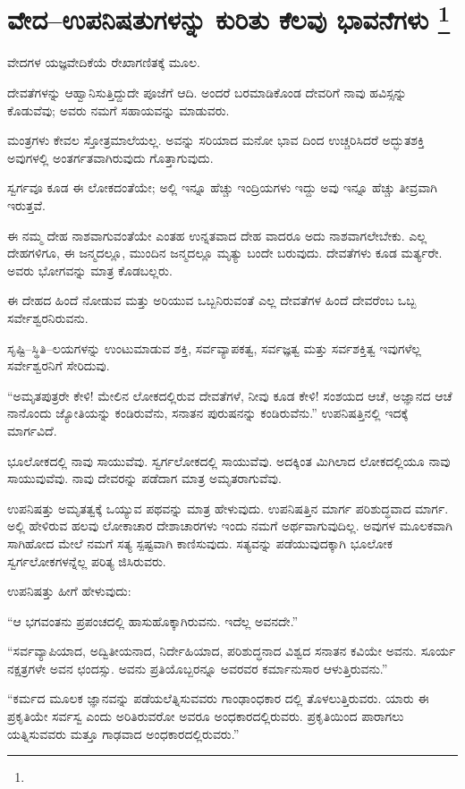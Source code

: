 
\chapter[ವೇದ–ಉಪನಿಷತುಗಳನ್ನು ಕುರಿತು ಕೆಲವು ಭಾವನೆಗಳು ]{ವೇದ–ಉಪನಿಷತುಗಳನ್ನು ಕುರಿತು ಕೆಲವು ಭಾವನೆಗಳು \protect\footnote{}}

ವೇದಗಳ ಯಜ್ಞವೇದಿಕೆಯೆ ರೇಖಾಗಣಿತಕ್ಕೆ  ಮೂಲ.

ದೇವತೆಗಳನ್ನು ಆಹ್ವಾನಿಸುತ್ತಿದ್ದುದೇ ಪೂಜೆಗೆ ಆದಿ. ಅಂದರೆ ಬರಮಾಡಿಕೊಂಡ ದೇವರಿಗೆ ನಾವು ಹವಿಸ್ಸನ್ನು ಕೊಡುವೆವು; ಅವರು ನಮಗೆ ಸಹಾಯವನ್ನು ಮಾಡುವರು.

ಮಂತ್ರಗಳು ಕೇವಲ ಸ್ತೋತ್ರಮಾಲೆಯಲ್ಲ. ಅವನ್ನು ಸರಿಯಾದ ಮನೋ ಭಾವ ದಿಂದ ಉಚ್ಚರಿಸಿದರೆ ಅದ್ಭುತಶಕ್ತಿ ಅವುಗಳಲ್ಲಿ ಅಂತರ್ಗತವಾಗಿರುವುದು ಗೊತ್ತಾಗುವುದು.

ಸ್ವರ್ಗವೂ ಕೂಡ ಈ ಲೋಕದಂತೆಯೇ; ಅಲ್ಲಿ ಇನ್ನೂ ಹೆಚ್ಚು ಇಂದ್ರಿಯಗಳು ಇದ್ದು ಅವು ಇನ್ನೂ ಹೆಚ್ಚು ತೀವ್ರವಾಗಿ ಇರುತ್ತವೆ.

ಈ ನಮ್ಮ ದೇಹ ನಾಶವಾಗುವಂತೆಯೇ ಎಂತಹ ಉನ್ನತವಾದ ದೇಹ ವಾದರೂ ಅದು ನಾಶವಾಗಲೇಬೇಕು. ಎಲ್ಲ ದೇಹಗಳಿಗೂ, ಈ ಜನ್ಮದಲ್ಲೂ, ಮುಂದಿನ ಜನ್ಮದಲ್ಲೂ ಮೃತ್ಯು ಬಂದೇ ಬರುವುದು. ದೇವತೆಗಳು ಕೂಡ ಮರ್ತ್ಯರೇ. ಅವರು ಭೋಗವನ್ನು ಮಾತ್ರ ಕೊಡಬಲ್ಲರು.

ಈ ದೇಹದ ಹಿಂದೆ ನೋಡುವ ಮತ್ತು ಅರಿಯುವ ಒಬ್ಬನಿರುವಂತೆ ಎಲ್ಲ ದೇವತೆಗಳ ಹಿಂದೆ ದೇವರೆಂಬ ಒಬ್ಬ ಸರ್ವೇಶ್ವರನಿರುವನು.

ಸೃಷ್ಟಿ–ಸ್ಥಿತಿ–ಲಯಗಳನ್ನು ಉಂಟುಮಾಡುವ ಶಕ್ತಿ, ಸರ್ವವ್ಯಾಪಕತ್ವ, ಸರ್ವಜ್ಞತ್ವ ಮತ್ತು ಸರ್ವಶಕ್ತಿತ್ವ ಇವುಗಳೆಲ್ಲ ಸರ್ವೇಶ್ವರನಿಗೆ ಸೇರಿದುವು.

“ಅಮೃತಪುತ್ರರೇ ಕೇಳಿ! ಮೇಲಿನ ಲೋಕದಲ್ಲಿರುವ ದೇವತೆಗಳೆ, ನೀವು ಕೂಡ ಕೇಳಿ! ಸಂಶಯದ ಆಚೆ, ಅಜ್ಞಾನದ ಆಚೆ ನಾನೊಂದು ಜ್ಯೋತಿಯನ್ನು ಕಂಡಿರುವೆನು, ಸನಾತನ ಪುರುಷನನ್ನು ಕಂಡಿರುವೆನು.” ಉಪನಿಷತ್ತಿನಲ್ಲಿ ಇದಕ್ಕೆ ಮಾರ್ಗವಿದೆ.

ಭೂಲೋಕದಲ್ಲಿ ನಾವು ಸಾಯುವೆವು. ಸ್ವರ್ಗಲೋಕದಲ್ಲಿ ಸಾಯುವೆವು. ಅದಕ್ಕಿಂತ ಮಿಗಿಲಾದ ಲೋಕದಲ್ಲಿಯೂ ನಾವು ಸಾಯುವುವೆವು. ನಾವು ದೇವರನ್ನು ಪಡೆದಾಗ ಮಾತ್ರ ಅಮೃತರಾಗುವೆವು.

ಉಪನಿಷತ್ತು ಅಮೃತತ್ವಕ್ಕೆ ಒಯ್ಯುವ ಪಥವನ್ನು ಮಾತ್ರ ಹೇಳುವುದು. ಉಪನಿಷತ್ತಿನ ಮಾರ್ಗ ಪರಿಶುದ್ಧವಾದ ಮಾರ್ಗ. ಅಲ್ಲಿ ಹೇಳಿರುವ ಹಲವು ಲೋಕಾಚಾರ ದೇಶಾಚಾರಗಳು ಇಂದು ನಮಗೆ ಅರ್ಥವಾಗುವುದಿಲ್ಲ. ಅವುಗಳ ಮೂಲಕವಾಗಿ ಸಾಗಿಹೋದ ಮೇಲೆ ನಮಗೆ ಸತ್ಯ ಸ್ಪಷ್ಟವಾಗಿ ಕಾಣಿಸುವುದು. ಸತ್ಯವನ್ನು ಪಡೆಯುವುದಕ್ಕಾಗಿ ಭೂಲೋಕ ಸ್ವರ್ಗಲೋಕಗಳನ್ನೆಲ್ಲ ಪರಿತ್ಯ ಜಿಸಿರುವರು.

ಉಪನಿಷತ್ತು ಹೀಗೆ ಹೇಳುವುದು:

“ಆ ಭಗವಂತನು ಪ್ರಪಂಚದಲ್ಲಿ ಹಾಸುಹೊಕ್ಕಾಗಿರುವನು. ಇದೆಲ್ಲ ಅವನದೇ.”

“ಸರ್ವವ್ಯಾಪಿಯಾದ, ಅದ್ವಿತೀಯನಾದ, ನಿರ್ದೇಹಿಯಾದ, ಪರಿಶುದ್ಧನಾದ ವಿಶ್ವದ ಸನಾತನ ಕವಿಯೇ ಅವನು. ಸೂರ್ಯ ನಕ್ಷತ್ರಗಳೇ ಅವನ ಛಂದಸ್ಸು. ಅವನು ಪ್ರತಿಯೊಬ್ಬರನ್ನೂ ಅವರವರ ಕರ್ಮಾನುಸಾರ ಆಳುತ್ತಿರುವನು.”

“ಕರ್ಮದ ಮೂಲಕ ಜ್ಞಾನವನ್ನು ಪಡೆಯಲೆತ್ನಿಸುವವರು ಗಾಂಢಾಂಧಕಾರ ದಲ್ಲಿ ತೊಳಲುತ್ತಿರುವರು. ಯಾರು ಈ ಪ್ರಕೃತಿಯೇ ಸರ್ವಸ್ವ ಎಂದು ಅರಿತಿರುವರೋ ಅವರೂ ಅಂಧಕಾರದಲ್ಲಿರುವರು. ಪ್ರಕೃತಿಯಿಂದ ಪಾರಾಗಲು ಯತ್ನಿಸುವವರು ಮತ್ತೂ ಗಾಢವಾದ ಅಂಧಕಾರದಲ್ಲಿರುವರು.”

